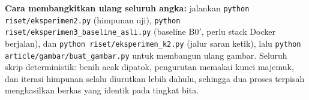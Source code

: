 \vspace{2ex}
\noindent
\textbf{Cara membangkitkan ulang seluruh angka:} jalankan
\texttt{python riset/eksperimen2.py} (himpunan uji),
\texttt{python riset/eksperimen3\_baseline\_asli.py} (baseline B0$'$, perlu
stack Docker berjalan), dan \texttt{python riset/eksperimen\_k2.py}
(jalur saran ketik), lalu \texttt{python article/gambar/buat\_gambar.py} untuk
membangun ulang gambar. Seluruh skrip deterministik: benih acak dipatok,
pengurutan memakai kunci majemuk, dan iterasi himpunan selalu diurutkan lebih
dahulu, sehingga dua proses terpisah menghasilkan berkas yang identik pada
tingkat bita.

\twocolumn
